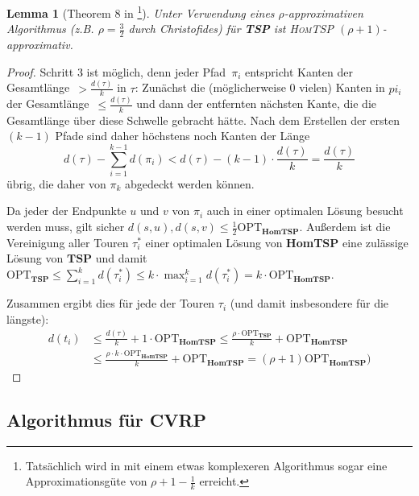 \documentclass[a4paper,ngerman,12pt,bibtotoc]{scrartcl}
\theoremstyle{definition}
\theoremstyle{plain}
\newtheorem{lemma}[defn]{Lemma}
\theoremstyle{remark}
\newcommand{\OPT}{\mathrm{OPT}}
\newcommand{\TSP}{\textbf{TSP}}
\newcommand{\HomTSP}{\textbf{HomTSP}}
\newcommand{\CVRP}{\textbf{CVRP}}
\begin{document}
	\begin{lemma}[Theorem 8 in \cite{TourSpliting}\footnote{Tatsächlich wird in \cite{TourSpliting} mit einem etwas komplexeren Algorithmus sogar eine Approximationsgüte von $\rho + 1 - \frac{1}{k}$ erreicht.}]
		Unter Verwendung eines $\rho$-approximativen Algorithmus (z.B. $\rho=\frac{3}{2}$ durch Christofides) für \TSP{} ist \textsc{HomTSP} $(\rho+1)$-approximativ.
	\end{lemma}
	
	\begin{proof}
		Schritt 3 ist möglich, denn jeder Pfad~$\pi_i$ entspricht Kanten der Gesamtlänge~${>\frac{d(\tau)}{k}}$ in $\tau$: Zunächst die (möglicherweise 0 vielen) Kanten in $pi_i$ der Gesamtlänge~$\leq \frac{d(\tau)}{k}$ und dann der entfernten nächsten Kante, die die Gesamtlänge über diese Schwelle gebracht hätte. Nach dem Erstellen der ersten $(k-1)$ Pfade sind daher höchstens noch Kanten der Länge 
			\[d(\tau) - \sum_{i=1}^{k-1}d(\pi_i) < d(\tau) - (k-1)\cdot \frac{d(\tau)}{k} = \frac{d(\tau)}{k}\]
		übrig, die daher von $\pi_k$ abgedeckt werden können.
		
		Da jeder der Endpunkte $u$ und $v$ von $\pi_i$ auch in einer optimalen Lösung besucht werden muss, gilt sicher $d(s,u), d(s,v) \leq \frac{1}{2}\OPT_\HomTSP$. Außerdem ist die Vereinigung aller Touren $\tau_i^\ast$ einer optimalen Lösung von \HomTSP{} eine zulässige Lösung von $\TSP$ und damit $\OPT_\TSP \leq \sum_{i=1}^{k}d(\tau_i^\ast) \leq k\cdot \max_{i=1}^{k}d(\tau_i^\ast) = k\cdot \OPT_\HomTSP$.
		
		Zusammen ergibt dies für jede der Touren $\tau_i$ (und damit insbesondere für die längste):
		\begin{align*}
			d(t_i) &\leq \frac{d(\tau)}{k} + 1\cdot \OPT_\HomTSP \leq \frac{\rho\cdot \OPT_\TSP}{k} + \OPT_\HomTSP \\
			       &\leq \frac{\rho\cdot k\cdot \OPT_\HomTSP}{k} + \OPT_\HomTSP = (\rho+1) \OPT_\HomTSP)
		\end{align*}
	\end{proof}
	
	\subsection{Algorithmus für \CVRP}
	
\end{document}
